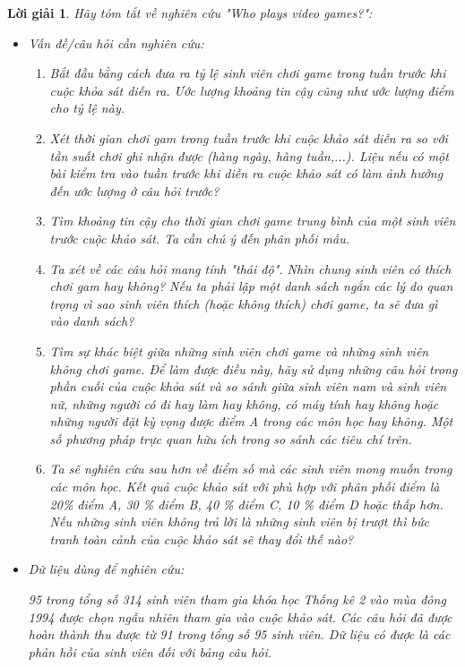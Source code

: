 \documentclass[14pt, a4paper]{article}
\theoremstyle{sltheorem}
\theoremstyle{soltheorem}
\newtheorem*{loigiai}{Lời giải}
\begin{document}
\begin{loigiai}
    Hãy tóm tắt về nghiên cứu "Who plays video games?":
    \begin{itemize}
        \item Vấn đề/câu hỏi cần nghiên cứu:
        \begin{enumerate}
            \item Bắt đầu bằng cách đưa ra tỷ lệ sinh viên chơi game trong tuần trước khi cuộc khỏa sát diễn ra.
            Ước lượng khoảng tin cậy cũng như ước lượng điểm cho tỷ lệ này.
            \item Xét thời gian chơi gam trong tuần trước khi cuộc khảo sát diễn ra so với tần suất chơi ghi nhận được (hàng ngày, hàng tuần,...).
            Liệu nếu có một bài kiểm tra vào tuần trước khi diễn ra cuộc khảo sát có làm ảnh hưởng đến ước lượng ở câu hỏi trước?
            \item Tìm khoảng tin cậy cho thời gian chơi game trung bình của một sinh viên trước cuộc khảo sát.
            Ta cần chú ý đến phân phối mẫu.
            \item Ta xét về các câu hỏi mang tính "thái độ".
            Nhìn chung sinh viên có thích chơi gam hay không?
            Nếu ta phải lập một danh sách ngắn các lý do quan trọng vì sao sinh viên thích (hoặc không thích) chơi game, ta sẽ đưa gì vào danh sách?
            \item Tìm sự khác biệt giữa những sinh viên chơi game và những sinh viên không chơi game.
            Để làm được điều này, hãy sử dụng những câu hỏi trong phần cuối của cuộc khỏa sát và so sánh giữa sinh viên nam và sinh viên nữ,
            những người có đi hay làm hay không, có máy tính hay không hoặc những người đặt kỳ vọng được điểm A trong các môn học hay không.
            Một số phương pháp trực quan hữu ích trong so sánh các tiêu chí trên.
            \item Ta sẽ nghiên cứu sau hơn về điểm số mà các sinh viên mong muốn trong các môn học.
            Kết quả cuộc khảo sát với phù hợp với phân phối điểm là 20\% điểm A, 30 \% điểm B, 40 \% điểm C, 10 \% điểm D hoặc thấp hơn.
            Nếu những sinh viên không trả lời là những sinh viên bị trượt thì bức tranh toàn cảnh của cuộc khảo sát sẽ thay đổi thế nào?
        \end{enumerate}

        \item Dữ liệu dùng để nghiên cứu:
        
        95 trong tổng số 314 sinh viên tham gia khóa học Thống kê 2 vào mùa đông 1994 được chọn ngẫu nhiên tham gia vào cuộc khảo sát.
        Các câu hỏi đã được hoàn thành thu được từ 91 trong tổng số 95 sinh viên.
        Dữ liệu có được là các phản hồi của sinh viên đối với bảng câu hỏi.


\end{itemize}
\end{loigiai}
\end{document}
